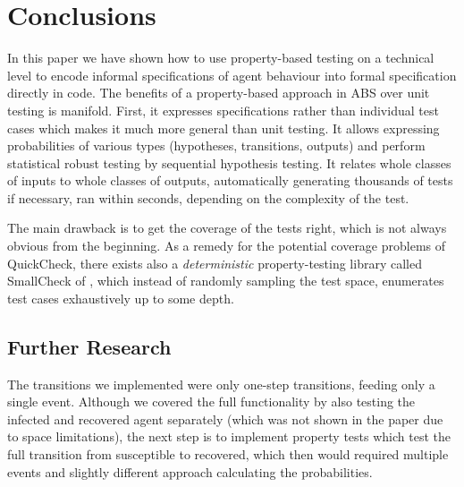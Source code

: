 \section{Conclusions}
\label{sec:conclusions}
In this paper we have shown how to use property-based testing on a technical level to encode informal specifications of agent behaviour into formal specification directly in code. The benefits of a property-based approach in ABS over unit testing is manifold. First, it expresses specifications rather than individual test cases which makes it much more general than unit testing. It allows expressing probabilities of various types (hypotheses, transitions, outputs) and perform statistical robust testing by sequential hypothesis testing. It relates whole classes of inputs to whole classes of outputs, automatically generating thousands of tests if necessary, ran within seconds, depending on the complexity of the test. 

The main drawback is to get the coverage of the tests right, which is not always obvious from the beginning. As a remedy for the potential coverage problems of QuickCheck, there exists also a \textit{deterministic} property-testing library called SmallCheck of \cite{runciman_smallcheck_2008}, which instead of randomly sampling the test space, enumerates test cases exhaustively up to some depth.


\subsection{Further Research}
The transitions we implemented were only one-step transitions, feeding only a single event. Although we covered the full functionality by also testing the infected and recovered agent separately (which was not shown in the paper due to space limitations), the next step is to implement property tests which test the full transition from susceptible to recovered, which then would required multiple events and slightly different approach calculating the probabilities.